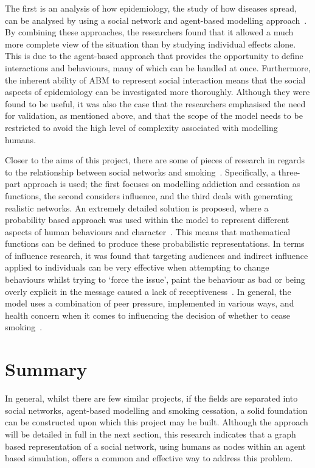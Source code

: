 \documentclass[]{report}
\begin{document}
The first is an analysis of how epidemiology, the study of how diseases spread, can be analysed by using a social network and agent-based modelling approach~\cite{epid}. By combining these approaches, the researchers found that it allowed a much more complete view of the situation than by studying individual effects alone. This is due to the agent-based approach that provides the opportunity to define interactions and behaviours, many of which can be handled at once. Furthermore, the inherent ability of ABM to represent social interaction means that the social aspects of epidemiology can be investigated more thoroughly. Although they were found to be useful, it was also the case that the researchers emphasised the need for validation, as mentioned above, and that the scope of the model needs to be restricted to avoid the high level of complexity associated with modelling humans.

Closer to the aims of this project, there are some of pieces of research in regards to the relationship between social networks and smoking~\cite{SmokOmni}. Specifically, a three-part approach is used; the first focuses on modelling addiction and cessation as functions, the second considers influence, and the third deals with generating realistic networks. An extremely detailed solution is proposed, where a probability based approach was used within the model to represent different aspects of human behaviours and character~\cite{SmokOmni-pap1}. This means that mathematical functions can be defined to produce these probabilistic representations. In terms of influence research, it was found that targeting audiences and indirect influence applied to individuals can be very effective when attempting to change behaviours whilst trying to `force the issue', paint the behaviour as bad or being overly explicit in the message caused a lack of receptiveness~\cite{SmokOmni-pap2}. In general, the model uses a combination of peer pressure, implemented in various ways, and health concern when it comes to influencing the decision of whether to cease smoking~\cite{SmokOmni-pap3}.

\section{Summary}
In general, whilst there are few similar projects, if the fields are separated into social networks, agent-based modelling and smoking cessation, a solid foundation can be constructed upon which this project may be built. Although the approach will be detailed in full in the next section, this research indicates that a graph based representation of a social network, using humans as nodes within an agent based simulation, offers a common and effective way to address this problem.
\end{document}
